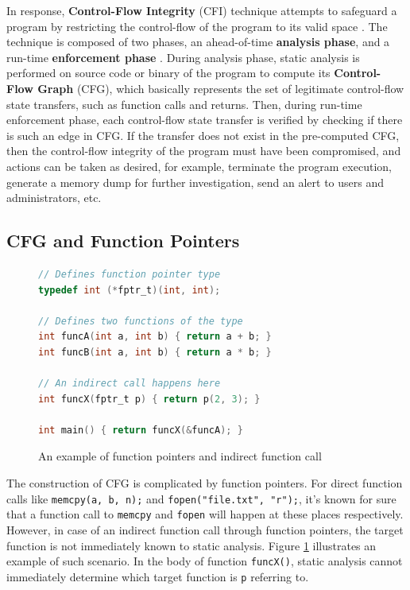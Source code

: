 \documentclass[12pt]{article}
\begin{document}
In response, \textbf{Control-Flow Integrity} (CFI) technique \cite{cfi2005} attempts to safeguard a program by restricting the control-flow of the program to its valid space \cite{nebelwelt}. The technique is composed of two phases, an ahead-of-time \textbf{analysis phase}, and a run-time \textbf{enforcement phase} \cite{BurowNathan2017CIPS}. During analysis phase, static analysis is performed on source code or binary of the program to compute its \textbf{Control-Flow Graph} (CFG), which basically represents the set of legitimate control-flow state transfers, such as function calls and returns. Then, during run-time enforcement phase, each control-flow state transfer is verified by checking if there is such an edge in CFG. If the transfer does not exist in the pre-computed CFG, then the control-flow integrity of the program must have been compromised, and actions can be taken as desired, for example, terminate the program execution, generate a memory dump for further investigation, send an alert to users and administrators, etc.

\subsection{CFG and Function Pointers}
\label{subsection:fptr}

\begin{figure}[h]
    \centering
    \begin{lstlisting}[language=c]
// Defines function pointer type
typedef int (*fptr_t)(int, int);

// Defines two functions of the type
int funcA(int a, int b) { return a + b; }
int funcB(int a, int b) { return a * b; }

// An indirect call happens here
int funcX(fptr_t p) { return p(2, 3); }

int main() { return funcX(&funcA); }
    \end{lstlisting}
    \caption{An example of function pointers and indirect function call}
    \label{fig:fptr}
\end{figure}

The construction of CFG is complicated by function pointers. For direct function calls like \texttt{memcpy(a, b, n);} and \texttt{fopen("file.txt", "r");}, it's known for sure that a function call to \texttt{memcpy} and \texttt{fopen} will happen at these places respectively. However, in case of an indirect function call through function pointers, the target function is not immediately known to static analysis. Figure \ref{fig:fptr} illustrates an example of such scenario. In the body of function \texttt{funcX()}, static analysis cannot immediately determine which target function is \texttt{p} referring to.
\end{document}
